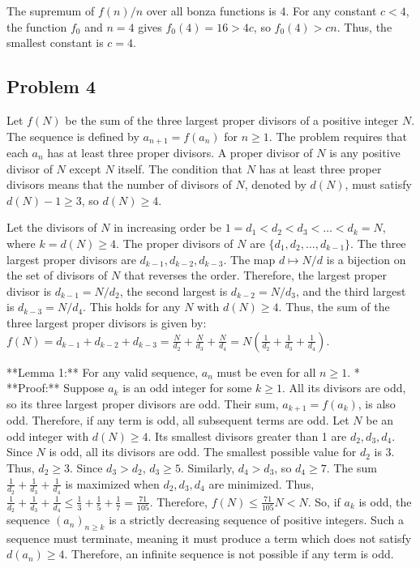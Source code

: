 \documentclass[12pt]{article}
\begin{document}
The supremum of $f(n)/n$ over all bonza functions is 4. For any constant $c<4$, the function $f_0$ and $n=4$ gives $f_0(4)=16 > 4c$, so $f_0(4)>cn$. Thus, the smallest constant is $c=4$.

\subsection{Problem 4}

Let $f(N)$ be the sum of the three largest proper divisors of a positive integer $N$. The sequence is defined by $a_{n+1} = f(a_n)$ for $n \ge 1$. The problem requires that each $a_n$ has at least three proper divisors. A proper divisor of $N$ is any positive divisor of $N$ except $N$ itself. The condition that $N$ has at least three proper divisors means that the number of divisors of $N$, denoted by $d(N)$, must satisfy $d(N)-1 \ge 3$, so $d(N) \ge 4$.

Let the divisors of $N$ in increasing order be $1=d_1 < d_2 < d_3 < \dots < d_k=N$, where $k=d(N) \ge 4$. The proper divisors of $N$ are $\{d_1, d_2, \dots, d_{k-1}\}$. The three largest proper divisors are $d_{k-1}, d_{k-2}, d_{k-3}$.
The map $d \mapsto N/d$ is a bijection on the set of divisors of $N$ that reverses the order. Therefore, the largest proper divisor is $d_{k-1} = N/d_2$, the second largest is $d_{k-2} = N/d_3$, and the third largest is $d_{k-3} = N/d_4$. This holds for any $N$ with $d(N) \ge 4$.
Thus, the sum of the three largest proper divisors is given by:
$f(N) = d_{k-1} + d_{k-2} + d_{k-3} = \frac{N}{d_2} + \frac{N}{d_3} + \frac{N}{d_4} = N\left(\frac{1}{d_2}+\frac{1}{d_3}+\frac{1}{d_4}\right)$.

**Lemma 1:** For any valid sequence, $a_n$ must be even for all $n \ge 1$.
*   **Proof:** Suppose $a_k$ is an odd integer for some $k \ge 1$. All its divisors are odd, so its three largest proper divisors are odd. Their sum, $a_{k+1} = f(a_k)$, is also odd. Therefore, if any term is odd, all subsequent terms are odd.
    Let $N$ be an odd integer with $d(N) \ge 4$. Its smallest divisors greater than 1 are $d_2, d_3, d_4$. Since $N$ is odd, all its divisors are odd. The smallest possible value for $d_2$ is 3. Thus, $d_2 \ge 3$. Since $d_3 > d_2$, $d_3 \ge 5$. Similarly, $d_4 > d_3$, so $d_4 \ge 7$.
    The sum $\frac{1}{d_2}+\frac{1}{d_3}+\frac{1}{d_4}$ is maximized when $d_2, d_3, d_4$ are minimized. Thus, $\frac{1}{d_2}+\frac{1}{d_3}+\frac{1}{d_4} \le \frac{1}{3}+\frac{1}{5}+\frac{1}{7} = \frac{71}{105}$.
    Therefore, $f(N) \le \frac{71}{105}N < N$.
    So, if $a_k$ is odd, the sequence $(a_n)_{n \ge k}$ is a strictly decreasing sequence of positive integers. Such a sequence must terminate, meaning it must produce a term which does not satisfy $d(a_n) \ge 4$. Therefore, an infinite sequence is not possible if any term is odd.
\end{document}
